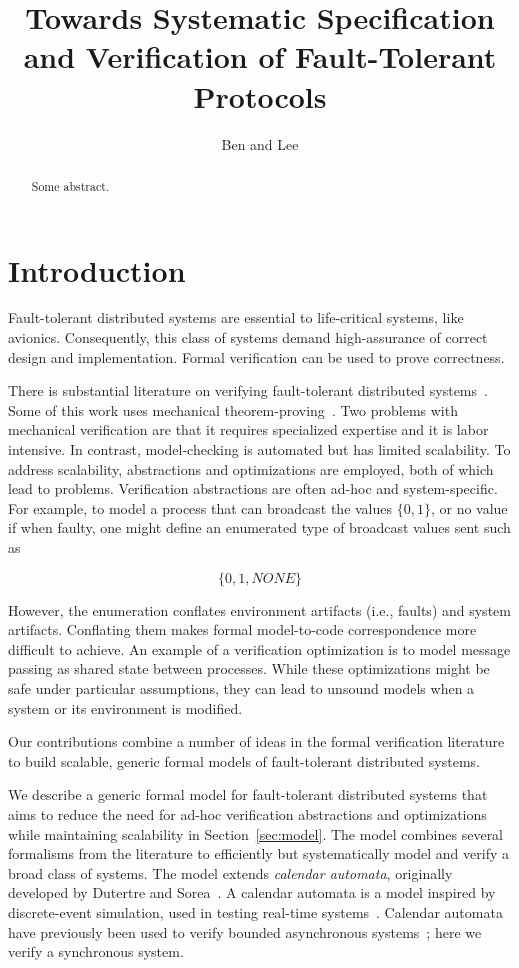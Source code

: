 \documentclass{IEEEtran/IEEEtran}
\begin{document}
\title{Towards Systematic Specification and Verification of Fault-Tolerant Protocols}
\author{Ben and Lee}


\maketitle


\begin{abstract}
  Some abstract.
\end{abstract}

\section{Introduction}

Fault-tolerant distributed systems are essential to life-critical systems, like avionics. Consequently, this class of systems demand high-assurance of correct design and implementation. Formal verification can be used to prove correctness.

There is substantial literature on verifying fault-tolerant distributed systems~\cite{}. Some of this work uses mechanical theorem-proving~\cite{}. Two problems with mechanical verification are that it requires specialized expertise and it is labor intensive. In contrast, model-checking is automated but has limited scalability. To address scalability, abstractions and optimizations are employed, both of which lead to problems. Verification abstractions are often ad-hoc and system-specific. For example, to model a process that can broadcast the values $\{0, 1\}$, or no value if when faulty, one might define an enumerated type of broadcast values sent such as

$$\{0, 1, NONE\}$$

However, the enumeration conflates environment artifacts (i.e., faults) and system artifacts. Conflating them makes formal model-to-code correspondence more difficult to achieve. An example of a verification optimization is to model message passing as shared state between processes. While these optimizations might be safe under particular assumptions, they can lead to unsound models when a system or its environment is modified.

Our contributions combine a number of ideas in the formal verification literature to build scalable, generic formal models of fault-tolerant distributed systems.

We describe a generic formal model for fault-tolerant distributed systems that aims to reduce the need for ad-hoc verification abstractions and optimizations while maintaining scalability in Section~\ref{sec:model}. The model combines several formalisms from the literature to efficiently but systematically model and verify a broad class of systems. The model extends \emph{calendar automata}, originally developed by Dutertre and Sorea~\cite{Dutertre-Sorea}. A calendar automata is a model inspired by discrete-event simulation, used in testing real-time systems~\cite{}.  Calendar automata have previously been used to verify bounded asynchronous systems~\cite{}; here we verify a synchronous system.
\end{document}
